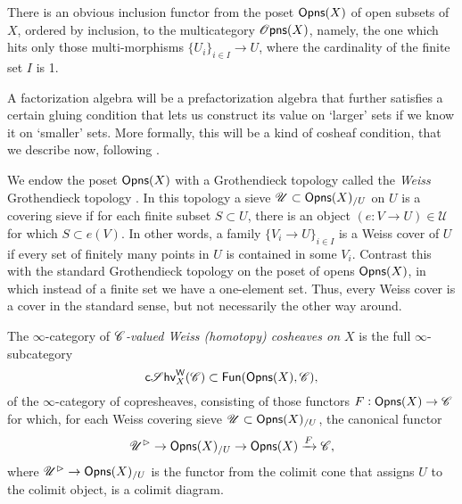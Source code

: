 \documentclass[../text]{subfiles}
\begin{document}
\begin{remark}\label{rem:op_to_op}
    There is an obvious inclusion functor from the poset $\opens[r](X)$ of open subsets of $X$, ordered by inclusion, to the multicategory $\opens[s](X)$, namely, the one which hits only those multi-morphisms $\{U_i\}_{i \in I} \rightarrow U$, where the cardinality of the finite set $I$ is 1.
\end{remark}


A factorization algebra will be a prefactorization algebra that further satisfies a certain gluing condition that lets us construct its value on `larger' sets if we know it on `smaller' sets. More formally, this will be a kind of cosheaf condition, that we describe now, following \cite{weiss1999,af_primer}.

We endow the poset $\opens[r](X)$ with a Grothendieck topology called the \emph{Weiss} Grothendieck topology \cite{weiss1999}. In this topology a sieve $\mathscr{U} \subset \opens[r](X)_{/U}$ on $U$ is a covering sieve if for each finite subset $S \subset U$, there is an object $(e: V \rightarrow U) \in \mathscr{U}$ for which $S \subset e(V)$. In other words, a family $\{ V_i \rightarrow U\}_{i \in I}$ is a Weiss cover of $U$ if every set of finitely many points in $U$ is contained in some $V_i$. Contrast this with the standard Grothendieck topology on the poset of opens $\opens[r](X)$, in which instead of a finite set we have a one-element set. Thus, every Weiss cover is a cover in the standard sense, but not necessarily the other way around.

\begin{definition}
    The $\infty$-category of \emph{$\mathscr{C}$-valued Weiss (homotopy) cosheaves on $X$} is the full $\infty$-subcategory
    \begin{equation}
        \csheaves[W]_{X}(\catC) \subset \mathsf{Fun}(\opens[r](X), \catC),
    \end{equation}
    of the $\infty$-category of copresheaves, consisting of those functors $F: \opens[r](X) \rightarrow \catC$ for which, for each Weiss covering sieve $\mathscr{U} \subset \opens[r](X)_{/U}$, the canonical functor
    \begin{equation}
        \mathscr{U}^{\vartriangleright} \rightarrow \opens[r](X)_{/U} \rightarrow \opens[r](X) \xrightarrow{F} \catC,
    \end{equation}
    where $\mathscr{U}^{\vartriangleright} \rightarrow \opens[r](X)_{/U}$ is the functor from the colimit cone that assigns $U$ to the colimit object, is a colimit diagram.
\end{definition}
\end{document}
